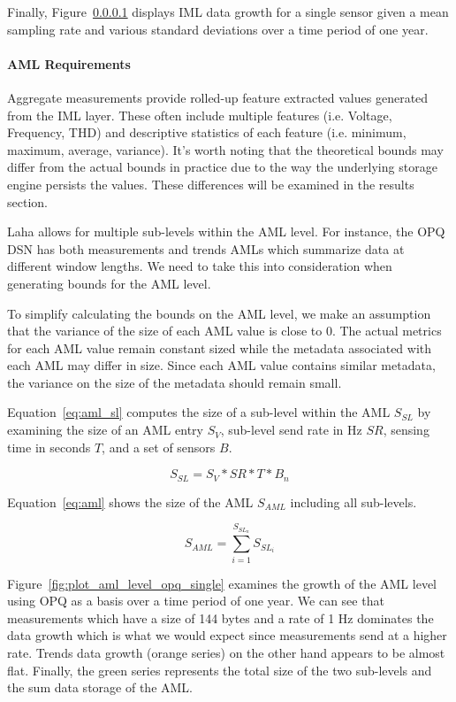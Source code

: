 Finally, Figure~\ref{} displays IML data growth for a single sensor given a mean sampling rate and various standard deviations over a time period of one year.


\paragraph{AML Requirements}
Aggregate measurements provide rolled-up feature extracted values generated from the IML layer. These often include multiple features (i.e. Voltage, Frequency, THD) and descriptive statistics of each feature (i.e. minimum, maximum, average, variance). It's worth noting that the theoretical bounds may differ from the actual bounds in practice due to the way the underlying storage engine persists the values. These differences will be examined in the results section.

Laha allows for multiple sub-levels within the AML level. For instance, the OPQ DSN has both measurements and trends AMLs which summarize data at different window lengths. We need to take this into consideration when generating bounds for the AML level.

To simplify calculating the bounds on the AML level, we make an assumption that the variance of the size of each AML value is close to 0. The actual metrics for each AML value remain constant sized while the metadata associated with each AML may differ in size. Since each AML value contains similar metadata, the variance on the size of the metadata should remain small.

Equation~\ref{eq:aml_sl} computes the size of a sub-level within the AML $S_{SL}$ by examining the size of an AML entry $S_{V}$, sub-level send rate in Hz $SR$, sensing time in seconds $T$, and a set of sensors $B$.

\begin{equation}\label{eq:aml_sl}
	S_{SL} = S_{V} * SR * T * B_{n}
\end{equation}

Equation~\ref{eq:aml} shows the size of the AML $S_{AML}$ including all sub-levels.

\begin{equation}\label{eq:aml}
	S_{AML} = \sum_{i=1}^{S_{SL_{n}}} S_{SL_{i}}
\end{equation}

Figure~\ref{fig:plot_aml_level_opq_single} examines the growth of the AML level using OPQ as a basis over a time period of one year. We can see that measurements which have a size of 144 bytes and a rate of 1 Hz dominates the data growth which is what we would expect since measurements send at a higher rate. Trends data growth (orange series) on the other hand appears to be almost flat. Finally, the green series represents the total size of the two sub-levels and the sum data storage of the AML.

